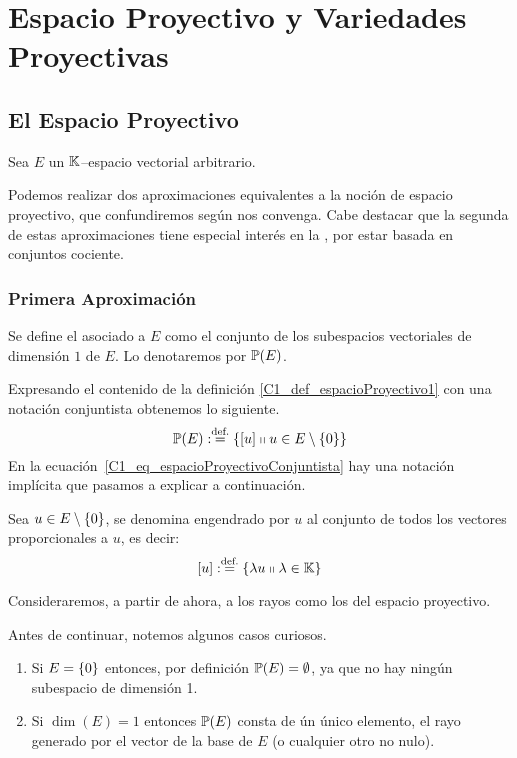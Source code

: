 \chapter{Espacio Proyectivo y Variedades Proyectivas}
\label{C1}
\section{El Espacio Proyectivo}
\label{C1_espacioProyectivo}
Sea $E$ un $\mathbb{K}$--espacio vectorial arbitrario.

Podemos realizar dos aproximaciones equivalentes a la noción de espacio proyectivo, que confundiremos según nos convenga. Cabe destacar que la segunda de estas aproximaciones tiene especial interés en la , por estar basada en conjuntos cociente.
\subsection{Primera Aproximación}
\label{C1_S1_primeraAprox}
\begin{defi}
	\label{C1_def_espacioProyectivo1}
	Se define el  asociado a $E$ como el conjunto de los subespacios vectoriales de dimensión $1$ de $E$. Lo denotaremos por $\mathbb{P}(E)$.
\end{defi}
Expresando el contenido de la definición \ref{C1_def_espacioProyectivo1} con una notación conjuntista obtenemos lo siguiente.
\begin{equation}
\label{C1_eq_espacioProyectivoConjuntista}
	\mathbb{P}(E):\stackrel{\textrm{def.}}{=}\{\left [ u \right ]\shortparallel u\in E\setminus\{0\}\}
\end{equation}
En la ecuación~\eqref{C1_eq_espacioProyectivoConjuntista} hay una notación implícita que pasamos a explicar a continuación.
\begin{defi}[Rayo]
	\label{C1_def_rayo}
	Sea $u\in E\setminus\{0\}$, se denomina  engendrado por $u$ al conjunto de todos los vectores proporcionales a $u$, es decir:
	\[\left [ u \right ]:\stackrel{\textrm{def.}}{=}\{\lambda u\shortparallel \lambda\in\mathbb{K}\}\] 
\end{defi}
Consideraremos, a partir de ahora, a los rayos como los  del espacio proyectivo.

Antes de continuar, notemos algunos casos curiosos.
\begin{obs}
	\label{C1_obs_casosExtremos}
	\begin{enumerate}
		\item Si $E=\{0\}$ entonces, por definición $\mathbb{P}(E)=\emptyset$, ya que no hay ningún subespacio de dimensión 1.
		\item Si $\dim(E)=1$ entonces $\mathbb{P}(E)$ consta de ún único elemento, el rayo generado por el vector de la base de $E$ (o cualquier otro no nulo).
	\end{enumerate}
\end{obs}
